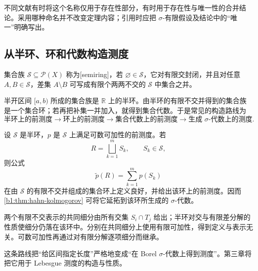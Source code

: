 不同文献有时将这个名称仅用于存在性部分，有时用于存在性与唯一性的合并结论。采用哪种命名并不改变定理内容；引用时应把 \(\sigma\)-有限假设及结论中的“唯一”明确写出。

\subsection{从半环、环和代数构造测度}
\label{b1:subsec:020405}

\begin{definition}
\label{b1:def:semiring}
集合族 \(\mathcal S\subseteq\mathcal P(X)\) 称为[semiring]，若 \(\varnothing\in\mathcal S\)，它对有限交封闭，并且对任意 \(A,B\in\mathcal S\)，差集 \(A\setminus B\) 可写成有限个两两不交的 \(\mathcal S\) 中集合之并。
\end{definition}

半开区间 \([a,b)\) 所成的集合族是 \(\mathbb R\) 上的半环。由半环的有限不交并得到的集合族是一个集合环；若再把补集一并加入，就得到集合代数。于是常见的构造路线为
\[
\text{半环上的前测度}
\longrightarrow
\text{环上的前测度}
\longrightarrow
\text{集合代数上的前测度}
\longrightarrow
\text{生成 \(\sigma\)-代数上的测度}.
\]

\begin{theorem}
\label{b1:thm:semiring-extension}
设 \(\mathcal S\) 是半环，\(p\) 是 \(\mathcal S\) 上满足可数可加性的前测度。若
\[
R=\bigsqcup_{k=1}^{m}S_k,
\qquad S_k\in\mathcal S,
\]
则公式
\[
\widetilde p(R)=\sum_{k=1}^{m}p(S_k)
\]
在由 \(\mathcal S\) 的有限不交并组成的集合环上定义良好，并给出该环上的前测度。因而 \cref{b1:thm:hahn-kolmogorov} 可将它延拓到该环所生成的 \(\sigma\)-代数。
\end{theorem}
\begin{proofsketch}
两个有限不交表示的共同细分由所有交集 \(S_i\cap T_j\) 给出；半环对交与有限差分解的性质使细分仍落在该环中。分别在共同细分上使用有限可加性，得到定义与表示无关。可数可加性再通过对有限分解逐项细分而继承。
\end{proofsketch}

这条路线把“给区间指定长度”严格地变成“在 Borel \(\sigma\)-代数上得到测度”。第三章将把它用于 Lebesgue 测度的构造与性质。
